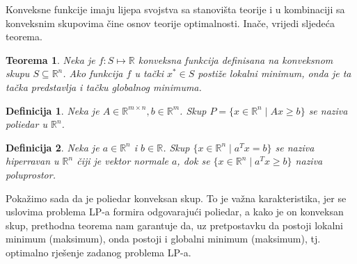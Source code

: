 \documentclass[a4paper, utf8, 11pt, colorlinks]{book}
\newtheorem{definition}{Definicija}
\newtheorem{thm}{Teorema}
\newenvironment{proof}{{Dokaz:}}{\hfill$\square$}
\begin{document}
Konveksne funkcije imaju lijepa svojstva sa stanovišta teorije i u kombinaciji sa konveksnim skupovima čine osnov  teorije optimalnosti. Inače, vrijedi sljedeća teorema.
\begin{thm}
  Neka je $f : S \mapsto \mathbb{R}$ konveksna funkcija definisana na konveksnom skupu $S \subseteq \mathbb{R}^n$. Ako funkcija $f$ u tački $x^* \in S$
 postiže lokalni minimum, onda je ta tačka predstavlja i tačku globalnog minimuma.
\end{thm}

\begin{definition}
   Neka je $A \in \mathbb{R}^{m \times n}, b \in \mathbb{R}^m$. Skup $P=\{x \in \mathbb{R}^n \mid Ax \geq b\}$ se naziva poliedar u $\mathbb{R}^n$. 
\end{definition}
\begin{definition}
   Neka je $a\in \mathbb{R}^n $ i $b \in \mathbb{R}$. Skup $\{ x \in \mathbb{R}^n \mid a^T x = b \}$ se naziva hiperravan u $\mathbb{R}^n$ čiji je vektor  normale $a$, dok se $\{ x \in \mathbb{R}^n \mid a^T x \geq b \}$ naziva poluprostor. 
\end{definition}
Pokažimo sada da je poliedar konveksan skup. To je važna karakteristika, jer se uslovima problema LP-a formira odgovarajući poliedar, a kako je on konveksan skup, prethodna teorema nam garantuje da, uz pretpostavku da postoji lokalni minimum (maksimum), onda postoji  i globalni minimum (maksimum), tj. optimalno rješenje zadanog problema LP-a.
\end{document}
